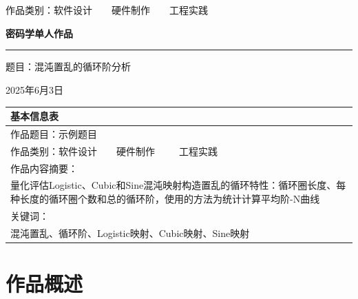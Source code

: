 \documentclass[a4paper]{article}
\newcommand{\cmark}{\ding{51}}%
\newcommand{\done}{\rlap{$\square$}{\raisebox{2pt}{\large\hspace{1pt}\cmark}}\hspace{-2.5pt}}
\begin{document}
\thispagestyle{empty}
\noindent\parbox[c]{.6\linewidth}{
	\linespread{1.3}
	\itshape  \par
    \  \par
    \  \par
    作品类别：\done 软件设计\ \ {\rlap{$\square$}{\large\hspace{1pt}}}\ \ 硬件制作\ \ {\rlap{$\square$}{\large\hspace{1pt}}}\ \ 工程实践 \par
}%



\begin{center}

\par\vspace{.2\textheight}

{\Large\textbf{密码学单人作品}\par}
\Large
\rule{\textwidth}{0.5mm}
\par\vspace{.05\textheight}
\Large{题目：混沌置乱的循环阶分析}

\medbreak
\par\vspace{.25\textheight}
\medbreak
2025年6月3日
\medbreak

\end{center}
\vfill
\begin{center}
        \begin{tabular}{ | p{.95\hsize} | }
    \hline
    基本信息表 \\
    \hline
    作品题目：示例题目\\
    \hline
    作品类别：\done 软件设计\ \ {\rlap{$\square$}{\large\hspace{1pt}}}\ \ 硬件制作\ \ \ {\rlap{$\square$}{\large\hspace{1pt}}}\ \ 工程实践 \\
    \hline
    作品内容摘要：\\
    \par 量化评估Logistic、Cubic和Sine混沌映射构造置乱的循环特性：循环圈长度、每种长度的循环圈个数和总的循环阶，使用的方法为统计计算平均阶-N曲线\\
    \hline
关键词：\\
混沌置乱、循环阶、Logistic映射、Cubic映射、Sine映射
\\
\hline
\end{tabular}
\end{center}

\clearpage
\tableofcontents
\clearpage
\section{作品概述}
\end{document}
